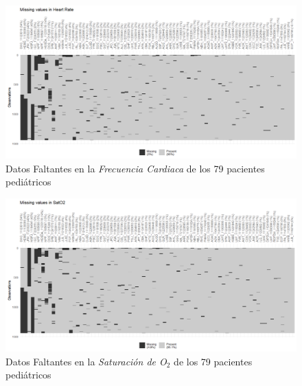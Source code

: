 \begin{landscape}

    \begin{figure}[H]
        \centering
        \includegraphics[scale = 0.9]{./img/missing-data-HR.png}
        \caption{Datos Faltantes en la \textit{Frecuencia Cardiaca} de los 79 pacientes pediátricos}
        \label{fig:missing-FC}
    \end{figure}
    
\end{landscape}
\restoregeometry 

\newpage
\thispagestyle{empty}

\begin{landscape}

    \begin{figure}[H]
        \centering
        \includegraphics[scale = 0.9]{./img/missing-data-SatO2.png}
        \caption{Datos Faltantes en la \textit{Saturación de O$_2$} de los 79 pacientes pediátricos}
        \label{fig:missing-SatO2}
    \end{figure}
    
\end{landscape}
\restoregeometry 

